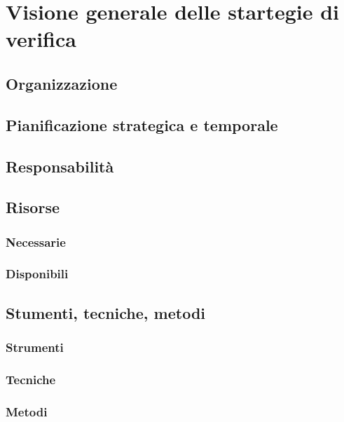 \section{Visione generale delle startegie di verifica}
\subsection{Organizzazione}
\subsection{Pianificazione strategica e temporale}
\subsection{Responsabilità}
\subsection{Risorse}
\subsubsection{Necessarie}
\subsubsection{Disponibili}
\subsection{Stumenti, tecniche, metodi}
\subsubsection{Strumenti}
\subsubsection{Tecniche}
\subsubsection{Metodi}